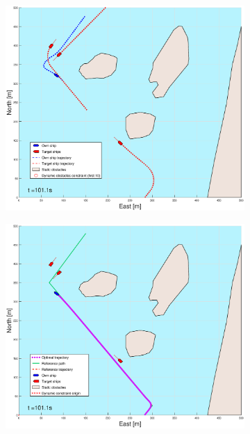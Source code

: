\begin{figure}[ht]\ContinuedFloat
    \begin{subfigure}[b]{0.49\textwidth}
        \centering
        \includegraphics[width=\textwidth]{Images/Figures/Helloya_Rev/_Simple_0fig1_time=101}
    \end{subfigure}
    \hfill
    \begin{subfigure}[b]{0.499\textwidth}
        \centering
        \includegraphics[width=\textwidth]{Images/Figures/Helloya_Rev/_Simple_0fig999_time=101}

\end{subfigure}
\end{figure}

